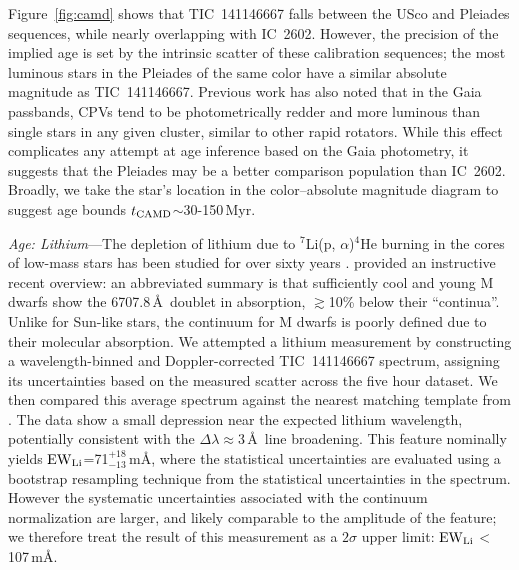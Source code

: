\documentclass{nature3}
\begin{document}
\begin{methods}
Figure~\ref{fig:camd} shows that TIC~141146667 falls between the USco
and Pleiades sequences, while nearly overlapping with IC~2602.  However,
the precision of the implied age is set by the intrinsic scatter of
these calibration sequences; the most luminous stars in the Pleiades of
the same color have a similar absolute magnitude as TIC~141146667.
Previous work \cite{Stauffer2021} has also noted that in the Gaia
passbands, CPVs tend to be photometrically redder and more luminous than
single stars in any given cluster, similar to other rapid rotators.
While this effect complicates any attempt at age inference based on the
Gaia photometry, it suggests that the Pleiades may be a better
comparison population than IC~2602.  Broadly, we take the star's
location in the color--absolute magnitude diagram to suggest age bounds
$t_{\rm CAMD}$$\sim$30-150\,Myr.


{\it Age: Lithium}---The depletion of lithium due to $^7$Li(p,
$\alpha$)$^4$He burning in the cores of low-mass stars has been studied
for over sixty years \cite{Hayashi1963,Bildsten1997,Burke2004}.
\cite{Wood2023} provided an instructive recent overview: an abbreviated
summary is that sufficiently cool and young M dwarfs show the 6707.8\,\AA\
doublet in absorption, $\gtrsim$10\% below their ``continua''.  Unlike
for Sun-like stars, the continuum for M dwarfs is poorly defined due to
their molecular absorption.  We attempted a lithium measurement by
constructing a wavelength-binned and Doppler-corrected TIC~141146667
spectrum, assigning its uncertainties based on the measured scatter
across the five hour dataset.  We then compared this average spectrum
against the nearest matching template from \cite{Bochanski2007}.  The
data show a small depression near the expected lithium wavelength,
potentially consistent with the $\Delta \lambda$$\approx$3\,\AA\ line
broadening.  This feature nominally yields ${\rm EW}_{\rm
Li}$=71$^{+18}_{-13}$\,m\AA, where the statistical uncertainties are
evaluated using a bootstrap resampling technique from the statistical
uncertainties in the spectrum.  However the systematic uncertainties associated
with the continuum normalization are larger, and likely comparable to
the amplitude of the feature; we therefore treat the result of this
measurement as a $2\sigma$ upper limit: ${\rm EW}_{\rm Li}$$<$107\,m\AA.


\end{methods}
\end{document}
